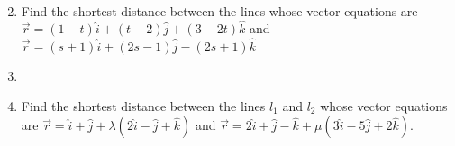 \begin{enumerate}[label=\thesection.\arabic*,ref=\thesection.\theenumi]
\begin{align}
        \label{eq:chapters/12/11/2/16/L2}
    \end{align}
    \solution
		
\item Find the shortest distance between the lines whose vector equations are \\
 $\overrightarrow{r}=(1-t)\hat{i}+(t-2)\hat{j}+(3-2t)\hat{k}$     and  \\$\overrightarrow{r}=(s+1)\hat{i}+(2s-1)\hat{j}-(2s+1)\hat{k}$
 \item 
\item Find the shortest distance between the lines $l_1$ and $l_2$ whose vector equations are ${\overrightarrow{r} = \hat{i}+\hat{j}+\lambda(2\hat{i}-\hat{j}+\hat{k})}$ and ${\overrightarrow{r} = 2\hat{i}+\hat{j}-\hat{k}+\mu(3\hat{i}-5\hat{j}+2\hat{k})}$.
    \solution
		
\end{enumerate}

